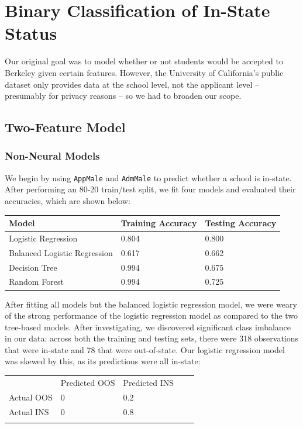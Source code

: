 \documentclass{article}
\begin{document}
\section{Binary Classification of In-State Status}

Our original goal was to model whether or not students would be accepted to Berkeley given certain features. However, the University of California's public dataset only provides data at the school level, not the applicant level – presumably for privacy reasons – so we had to broaden our scope.

\subsection{Two-Feature Model}

\subsubsection{Non-Neural Models}

We begin by using \texttt{AppMale} and \texttt{AdmMale} to predict whether a school is in-state. After performing an 80-20 train/test split, we fit four models and evaluated their accuracies, which are shown below:

\begin{tabular}{lll}
\toprule
Model &   Training Accuracy &   Testing Accuracy\\
\midrule
Logistic Regression & 0.804 & 0.800 \\
Balanced Logistic Regression & 0.617 & 0.662 \\
Decision Tree & 0.994 & 0.675 \\
Random Forest & 0.994 & 0.725 \\
\bottomrule
\end{tabular}

After fitting all models but the balanced logistic regression model, we were weary of the strong performance of the logistic regression model as compared to the two tree-based models. After investigating, we discovered significant class imbalance in our data: across both the training and testing sets, there were 318 observations that were in-state and 78 that were out-of-state. Our logistic regression model was skewed by this, as its predictions were all in-state: 

\begin{table}[htb]
\centering
\begin{tabular}{lllll}
\cline{1-3}
\multicolumn{1}{|l|}{} & \multicolumn{1}{l|}{Predicted OOS} & \multicolumn{1}{l|}{Predicted INS} &  &  \\ \cline{1-3}
\multicolumn{1}{|l|}{Actual OOS} & \multicolumn{1}{l|}{0} & \multicolumn{1}{l|}{0.2} &  &  \\ \cline{1-3}
\multicolumn{1}{|l|}{Actual INS} & \multicolumn{1}{l|}{0} & \multicolumn{1}{l|}{0.8} &  &  \\ \cline{1-3}
 &  &  &  & 
\end{tabular}
\end{table}
\end{document}
